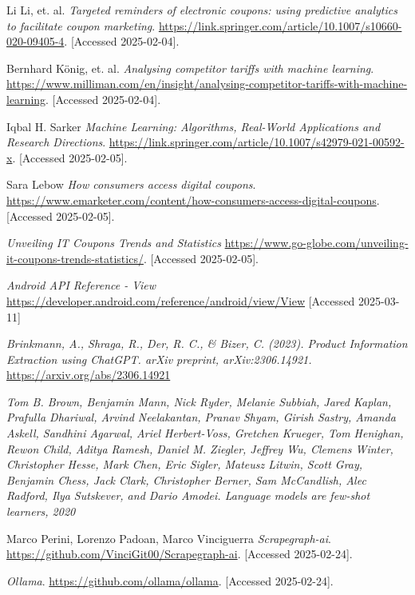\documentclass[licencjacka,en]{pracamgr}
\begin{document}
\begin{thebibliography}{99}
Li Li, et. al.
\textit{Targeted reminders of electronic coupons: using predictive analytics to facilitate coupon marketing}.
\url{https://link.springer.com/article/10.1007/s10660-020-09405-4}.
[Accessed 2025-02-04].

Bernhard König, et. al.
\textit{Analysing competitor tariffs with machine learning}.
\url{https://www.milliman.com/en/insight/analysing-competitor-tariffs-with-machine-learning}.
[Accessed 2025-02-04].

Iqbal H. Sarker
\textit{Machine Learning: Algorithms, Real-World Applications and Research Directions}.
\url{https://link.springer.com/article/10.1007/s42979-021-00592-x}.
[Accessed 2025-02-05].

Sara Lebow
\textit{How consumers access digital coupons}.
\url{https://www.emarketer.com/content/how-consumers-access-digital-coupons}.
[Accessed 2025-02-05].

\textit{Unveiling IT Coupons Trends and Statistics}
\url{https://www.go-globe.com/unveiling-it-coupons-trends-statistics/}.
[Accessed 2025-02-05].

\textit{Android API Reference - View}
\url{https://developer.android.com/reference/android/view/View}
[Accessed 2025-03-11]

\textit{Brinkmann, A., Shraga, R., Der, R. C., \& Bizer, C. (2023). Product Information Extraction using ChatGPT. arXiv preprint, arXiv:2306.14921.}
\url{https://arxiv.org/abs/2306.14921}

\textit{Tom B. Brown, Benjamin Mann, Nick Ryder, Melanie Subbiah, Jared
Kaplan, Prafulla Dhariwal, Arvind Neelakantan, Pranav Shyam, Girish
Sastry, Amanda Askell, Sandhini Agarwal, Ariel Herbert-Voss, Gretchen
Krueger, Tom Henighan, Rewon Child, Aditya Ramesh, Daniel M.
Ziegler, Jeffrey Wu, Clemens Winter, Christopher Hesse, Mark Chen,
Eric Sigler, Mateusz Litwin, Scott Gray, Benjamin Chess, Jack Clark,
Christopher Berner, Sam McCandlish, Alec Radford, Ilya Sutskever, and
Dario Amodei. Language models are few-shot learners, 2020}

Marco Perini, Lorenzo Padoan, Marco Vinciguerra
\textit{Scrapegraph-ai}.
\url{https://github.com/VinciGit00/Scrapegraph-ai}.
[Accessed 2025-02-24].

\textit{Ollama}.
\url{https://github.com/ollama/ollama}.
[Accessed 2025-02-24].


\end{thebibliography}
\end{document}
